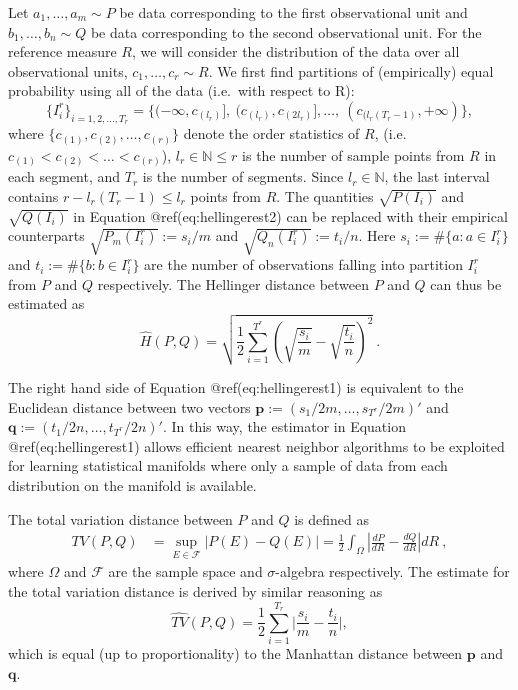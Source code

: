 \documentclass{article}
\begin{document}
Let \(a_1,\dots,a_m\sim P\) be data corresponding to the first
observational unit and \(b_1,\dots,b_n\sim Q\) be data corresponding to
the second observational unit. For the reference measure \(R\), we will
consider the distribution of the data over all observational units,
\(c_1,\dots,c_r\sim R\). We first find partitions of (empirically) equal
probability using all of the data (i.e.~with respect to R):
\begin{equation}\label{eq:segments}
\{I_i^r \}_{i=1,2,\dots,T_r} = \{ (-\infty, c_{(l_r)}], \ (c_{(l_r)}, c_{(2l_r)} ], \dots, \ (c_{(l_r(T_r-1)}, + \infty ) \},
\end{equation} where \(\{c_{(1)}, c_{(2)}, \dots, c_{(r)}\}\) denote the
order statistics of \(R\),
(i.e.~\(c_{(1)} < c_{(2)} < \dots < c_{(r)}\)),
\(l_r \in \mathbb{N} \leq r\) is the number of sample points from \(R\)
in each segment, and \(T_r\) is the number of segments. Since
\(l_r \in \mathbb{N}\), the last interval contains
\(r-l_r(T_r-1) \leq l_r\) points from \(R\). The quantities
\(\sqrt{P(I_i)}\) and \(\sqrt{Q(I_i)}\) in Equation
@ref(eq:hellingerest2) can be replaced with their empirical counterparts
\(\sqrt{P_m(I^r_i)}:=s_i/m\) and \(\sqrt{Q_n(I^r_i)}:=t_i/n\). Here
\(s_i:=\#\{a:a\in I^r_i\}\) and \(t_i:=\#\{b:b\in I^r_i\}\) are the
number of observations falling into partition \(I_i^r\) from \(P\) and
\(Q\) respectively. The Hellinger distance between \(P\) and \(Q\) can
thus be estimated as \begin{equation}\label{eq:hellingerest1}
\hat{H}(P,Q) =  \sqrt{\frac{1}{2}\sum_{i=1}^{T^r} \left(\sqrt{\frac{s_i}{m}} - \sqrt{\frac{t_i}{n}}\right)^2} \ .
\end{equation}

The right hand side of Equation @ref(eq:hellingerest1) is equivalent to
the Euclidean distance between two vectors
\(\bm{p}:=(s_1/2m,\dots,s_{T^r}/2m)'\) and
\(\bm{q}:=(t_1/2n,\dots,t_{T^r}/2n)'\). In this way, the estimator in
Equation @ref(eq:hellingerest1) allows efficient nearest neighbor
algorithms to be exploited for learning statistical manifolds where only
a sample of data from each distribution on the manifold is available.

The total variation distance between \(P\) and \(Q\) is defined as
\begin{align}\label{eq:tvddef}
TV(P , Q) &= \sup_{E \in \mathcal{F}} |P(E) - Q(E)|
= \frac{1}{2} \int_{\Omega} \left|\frac{dP}{dR} - \frac{dQ}{dR}\right|dR \ ,
\end{align} where \(\Omega\) and \(\mathcal{F}\) are the sample space
and \(\sigma\)-algebra respectively. The estimate for the total
variation distance is derived by similar reasoning as
\begin{equation}\label{eq:tvdest1}
\hat{TV}(P , Q) = \frac{1}{2} \sum_{i=1}^{T_r} \bigg| \frac{s_i}{m} - \frac{t_i}{n} \bigg| ,
\end{equation} which is equal (up to proportionality) to the Manhattan
distance between \(\bm{p}\) and \(\bm{q}\).
\end{document}
